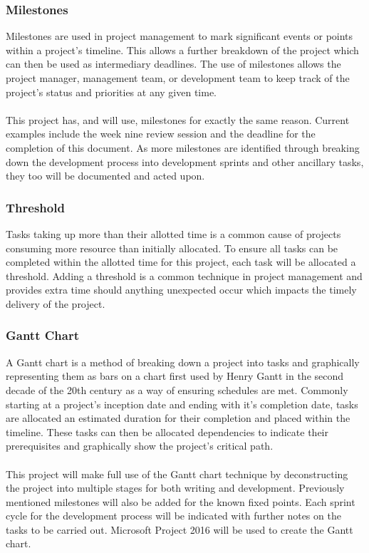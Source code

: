 	\subsubsection{Milestones}
		Milestones are used in project management to mark significant events or points within a project’s timeline. This allows a further breakdown of the project which can then be used as intermediary deadlines. The use of milestones allows the project manager, management team, or development team to keep track of the project’s status and priorities at any given time.
		\\\\
		This project has, and will use, milestones for exactly the same reason. Current examples include the week nine review session and the deadline for the completion of this document. As more milestones are identified through breaking down the development process into development sprints and other ancillary tasks, they too will be documented and acted upon.
	\subsubsection{Threshold}
		Tasks taking up more than their allotted time is a common cause of projects consuming more resource than initially allocated. To ensure all tasks can be completed within the allotted time for this project, each task will be allocated a threshold. Adding a threshold is a common technique in project management and provides extra time should anything unexpected occur which impacts the timely delivery of the project.
	\subsubsection{Gantt Chart}\label{sec:methodology_gantt}
		A Gantt chart is a method of breaking down a project into tasks and graphically representing them as bars on a chart first used by Henry Gantt in the second decade of the 20th century as a way of ensuring schedules are met. Commonly starting at a project’s inception date and ending with it’s completion date, tasks are allocated an estimated duration for their completion and placed within the timeline. These tasks can then be allocated dependencies to indicate their prerequisites and graphically show the project’s critical path.
		\\\\
		This project will make full use of the Gantt chart technique by deconstructing the project into multiple stages for both writing and development. Previously mentioned milestones will also be added for the known fixed points. Each sprint cycle for the development process will be indicated with further notes on the tasks to be carried out. Microsoft Project 2016 will be used to create the Gantt chart.
